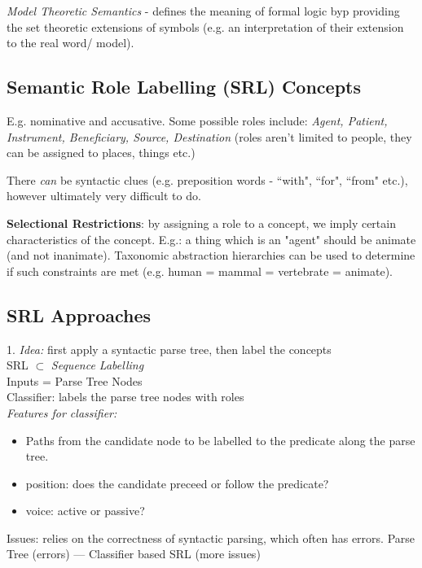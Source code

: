 \documentclass[]{article}
\begin{document}
    \textit{Model Theoretic Semantics} - defines the meaning of formal logic byp providing the set theoretic extensions of symbols (e.g. an interpretation of their extension to the real word/ model).
	
	
	\subsection{Semantic Role Labelling (SRL) Concepts}
	
	E.g. nominative and accusative. Some possible roles include: \textit{Agent, Patient, Instrument, Beneficiary, Source, Destination} (roles aren't limited to people, they can be assigned to places, things etc.)
	
	There \textit{can} be syntactic clues (e.g. preposition words - ``with", ``for", ``from" etc.), however ultimately very difficult to do.
	
	\textbf{Selectional Restrictions}: by assigning a role to a concept, we imply certain characteristics of the concept. E.g.: a thing which is an "agent" should be animate (and not inanimate). Taxonomic abstraction hierarchies can be used to determine if such constraints are met (e.g. human = mammal = vertebrate = animate). 
	
	\subsection{SRL Approaches}
	
	1. \textit{Idea:} first apply a syntactic parse tree, then label the concepts \\
	SRL $\subset$ \textit{Sequence Labelling} \\
	Inputs = Parse Tree Nodes \\
	Classifier: labels the parse tree nodes with roles \\
	
	\textit{Features for classifier: }
	\begin{itemize}
	 \item Paths from the candidate node to be labelled to the predicate along the parse tree.
     \item position: does the candidate preceed or follow the predicate?
     \item voice: active or passive?
	\end{itemize}
    
    Issues: relies on the correctness of syntactic parsing, which often has errors. Parse Tree (errors) --- Classifier based SRL (more issues) \\ 
    
\end{document}
